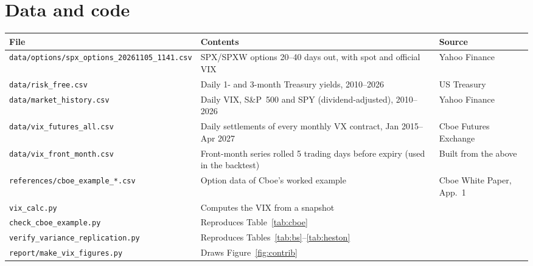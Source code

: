 
\section{Data and code}
\begin{table}[H]
\centering
\small
\footnotesize
\begin{tabular}{@{}p{6.0cm}p{4.8cm}p{2.8cm}@{}}
\toprule
\textbf{File} & \textbf{Contents} & \textbf{Source}\\
\midrule
\texttt{data/options/}\newline\texttt{spx\_options\_20261105\_1141.csv} & SPX/SPXW options 20--40 days out, with spot and official VIX & Yahoo Finance\\
\texttt{data/risk\_free.csv} & Daily 1- and 3-month Treasury yields, 2010--2026 & US Treasury\\
\texttt{data/market\_history.csv} & Daily VIX, S\&P~500 and SPY (dividend-adjusted), 2010--2026 & Yahoo Finance\\
\texttt{data/vix\_futures\_all.csv} & Daily settlements of every monthly VX contract, Jan 2015--Apr 2027 & Cboe Futures Exchange\\
\texttt{data/vix\_front\_month.csv} & Front-month series rolled 5 trading days before expiry (used in the backtest) & Built from the above\\
\texttt{references/}\newline\texttt{cboe\_example\_*.csv} & Option data of Cboe's worked example & Cboe White Paper, App.~1\\
\midrule
\texttt{vix\_calc.py} & Computes the VIX from a snapshot & \\
\texttt{check\_cboe\_example.py} & Reproduces Table~\ref{tab:cboe} & \\
\texttt{verify\_variance\_replication.py} & Reproduces Tables~\ref{tab:bs}--\ref{tab:heston} & \\
\texttt{report/make\_vix\_figures.py} & Draws Figure~\ref{fig:contrib} & \\
\bottomrule
\end{tabular}
\end{table}
